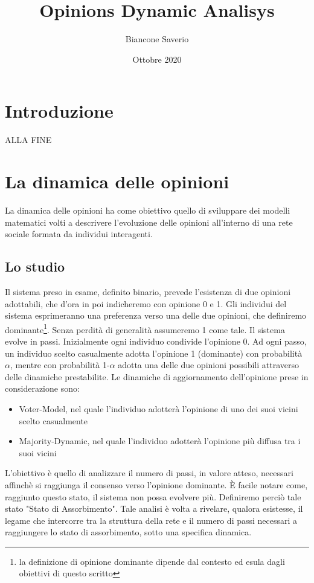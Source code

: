\documentclass{article}
\title{Opinions Dynamic Analisys}
\author{Biancone Saverio}
\date{Ottobre 2020}
\begin{document}
\maketitle

\section{Introduzione}
ALLA FINE
\section{La dinamica delle opinioni}
La dinamica delle opinioni ha come obiettivo quello di sviluppare dei modelli matematici volti a descrivere l'evoluzione delle opinioni all'interno di una rete sociale formata da individui interagenti.
\newline
\newline
\subsection{Lo studio}
Il sistema preso in esame, definito binario, prevede l'esistenza di due opinioni adottabili, che d'ora in poi indicheremo con opinione 0 e 1. Gli individui del sistema esprimeranno una preferenza verso una delle due opinioni, che definiremo  dominante\footnote{la definizione di opinione dominante dipende dal contesto ed esula dagli obiettivi di questo scritto}.
\newline
Senza perdità di generalità assumeremo 1 come tale.
\newline
\newline
Il sistema evolve in passi. Inizialmente ogni individuo condivide l'opinione 0.
\newline
Ad ogni passo, un individuo scelto casualmente adotta l'opinione 1 (dominante) con probabilità $\alpha$, mentre con probabilità 1-$\alpha$ adotta una delle due opinioni possibili attraverso delle dinamiche prestabilite.
\newline
\newline
Le dinamiche di aggiornamento dell'opinione prese in considerazione sono:
\begin{itemize}
\item Voter-Model, nel quale l'individuo adotterà l'opinione di uno dei suoi vicini scelto casualmente
\item Majority-Dynamic, nel quale l'individuo adotterà l'opinione più diffusa tra i suoi vicini
\end{itemize}
\newline
L'obiettivo è quello di analizzare il numero di passi, in valore atteso, necessari affinchè si raggiunga il consenso verso l'opinione dominante. È facile notare come, raggiunto questo stato, il sistema non possa evolvere più. Definiremo perciò tale stato "Stato di Assorbimento". 
\newline
\newline
Tale analisi è volta a rivelare, qualora esistesse, il legame che intercorre tra la struttura della rete e il numero di passi necessari a raggiungere lo stato di assorbimento, sotto una specifica dinamica.
\end{document}
